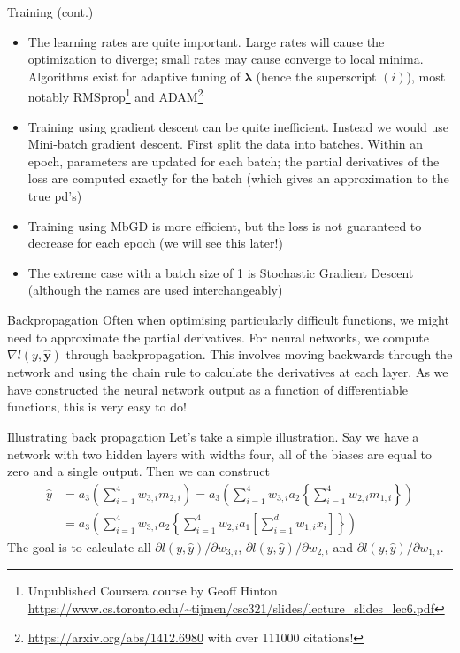 \documentclass{beamer}
\begin{document}
\begin{frame}{Training (cont.)}
\begin{itemize}
\item The learning rates are quite important. Large rates will cause the optimization to diverge; small rates may cause converge to local minima. Algorithms exist for adaptive tuning of $\boldsymbol{\lambda}$ (hence the superscript $(i)$), most notably RMSprop\footnote{Unpublished Coursera course by Geoff Hinton \url{https://www.cs.toronto.edu/~tijmen/csc321/slides/lecture_slides_lec6.pdf}} and ADAM\footnote{\url{https://arxiv.org/abs/1412.6980} with over 111000 citations!}
\item Training using gradient descent can be quite inefficient. Instead we would use Mini-batch gradient descent. First split the data into batches. Within an epoch, parameters are updated for each batch; the partial derivatives of the loss are computed exactly for the batch (which gives an approximation to the true pd's) 
\item Training using MbGD is more efficient, but the loss is not guaranteed to decrease for each epoch (we will see this later!)
\item The extreme case with a batch size of 1 is Stochastic Gradient Descent (although the names are used interchangeably)
\end{itemize} 
\end{frame}
\begin{frame}{Backpropagation}
Often when optimising particularly difficult functions, we might need to approximate the partial derivatives. For neural networks, we compute $\nabla l(y,\hat{\mathbf{y}})$ through backpropagation. This involves moving backwards through the network and using the chain rule to calculate the derivatives at each layer. As we have constructed the neural network output as a function of differentiable functions, this is very easy to do!
\end{frame}
\begin{frame}{Illustrating back propagation}
Let's take a simple illustration. Say we have a network with two hidden layers with widths four, all of the biases are equal to zero and a single output. Then we can construct \begin{align*}
\hat{y}&=a_3\left(\sum^4_{i=1}w_{3,i}m_{2,i}\right)=a_3\left(\sum^4_{i=1}w_{3,i}a_2\left\{\sum^4_{i=1}w_{2,i}m_{1,i}\right\}\right)\\
&=a_3\left(\sum^4_{i=1}w_{3,i}a_2\left\{\sum^4_{i=1}w_{2,i}a_1\left[\sum^d_{i=1}w_{1,i}x_i\right]\right\}\right)
\end{align*}
The goal is to calculate all $\partial l(y,\hat{y})/\partial w_{3,i}$, $\partial l(y,\hat{y})/\partial w_{2,i}$ and $\partial l(y,\hat{y})/\partial w_{1,i}$.
\end{frame}
\end{document}
